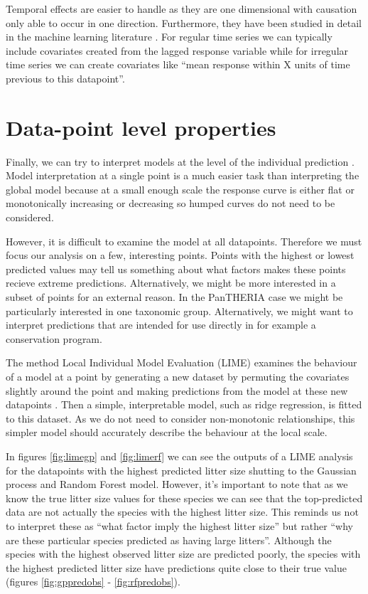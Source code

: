\documentclass[10pt,]{article}
\begin{document}
Temporal effects are easier to handle as they are one dimensional with causation only able to occur in one direction.
Furthermore, they have been studied in detail in the machine learning literature \citep{jeong2008non}.
For regular time series we can typically include covariates created from the lagged response variable while for irregular time series we can create covariates like ``mean response within X units of time previous to this datapoint''.

\section{Data-point level properties}\label{data-point-level-properties}

Finally, we can try to interpret models at the level of the individual prediction \citep{lime, ribeiro2016should, lundberg2017unified, ribeiro2016nothing}.
Model interpretation at a single point is a much easier task than interpreting the global model because at a small enough scale the response curve is either flat or monotonically increasing or decreasing so humped curves do not need to be considered.

However, it is difficult to examine the model at all datapoints.
Therefore we must focus our analysis on a few, interesting points.
Points with the highest or lowest predicted values may tell us something about what factors makes these points recieve extreme predictions.
Alternatively, we might be more interested in a subset of points for an external reason.
In the PanTHERIA case we might be particularly interested in one taxonomic group.
Alternatively, we might want to interpret predictions that are intended for use directly in for example a conservation program.

The method Local Individual Model Evaluation (LIME) examines the behaviour of a model at a point by generating a new dataset by permuting the covariates slightly around the point and making predictions from the model at these new datapoints \citep{lime, ribeiro2016should, lundberg2017unified, ribeiro2016nothing}.
Then a simple, interpretable model, such as ridge regression, is fitted to this dataset.
As we do not need to consider non-monotonic relationships, this simpler model should accurately describe the behaviour at the local scale.

In figures \ref{fig:limegp} and \ref{fig:limerf} we can see the outputs of a LIME analysis for the datapoints with the highest predicted litter size shutting to the Gaussian process and Random Forest model.
However, it's important to note that as we know the true litter size values for these species we can see that the top-predicted data are not actually the species with the highest litter size.
This reminds us not to interpret these as ``what factor imply the highest litter size'' but rather ``why are these particular species predicted as having large litters''.
Although the species with the highest observed litter size are predicted poorly, the species with the highest predicted litter size have predictions quite close to their true value (figures \ref{fig:gppredobs} - \ref{fig:rfpredobs}).
\end{document}
